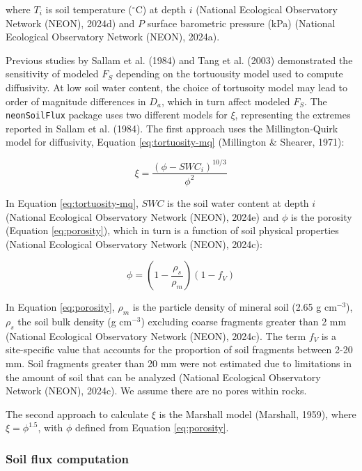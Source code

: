 \documentclass[
  letterpaper,
  DIV=11,
  numbers=noendperiod]{scrartcl}
\begin{document}
where \(T_{i}\) is soil temperature (\(^\circ\)C) at depth \(i\)
(National Ecological Observatory Network (NEON), 2024d) and \(P\)
surface barometric pressure (kPa) (National Ecological Observatory
Network (NEON), 2024a).

Previous studies by Sallam et al. (1984) and Tang et al. (2003)
demonstrated the sensitivity of modeled \(F_{S}\) depending on the
tortuousity model used to compute diffusivity. At low soil water
content, the choice of tortusoity model may lead to order of magnitude
differences in \(D_{a}\), which in turn affect modeled \(F_{S}\). The
\texttt{neonSoilFlux} package uses two different models for \(\xi\),
representing the extremes reported in Sallam et al. (1984). The first
approach uses the Millington-Quirk model for diffusivity, Equation
\ref{eq:tortuosity-mq} (Millington \& Shearer, 1971):

\begin{equation}
  \xi = \frac{(\phi - SWC_{i})^{10/3}}{\phi^{2}}
  \label{eq:tortuosity-mq}
\end{equation}

In Equation \ref{eq:tortuosity-mq}, \(SWC\) is the soil water content at
depth \(i\) (National Ecological Observatory Network (NEON), 2024e) and
\(\phi\) is the porosity (Equation \ref{eq:porosity}), which in turn is
a function of soil physical properties (National Ecological Observatory
Network (NEON), 2024c):

\begin{equation}
  \phi = \left(1- \frac{\rho_{s}}{\rho_{m}} \right) \left(1-f_{V}\right)
  \label{eq:porosity}
\end{equation}

In Equation \ref{eq:porosity}, \(\rho_{m}\) is the particle density of
mineral soil (2.65 g cm\(^{-3}\)), \(\rho_{s}\) the soil bulk density (g
cm\(^{-3}\)) excluding coarse fragments greater than 2 mm (National
Ecological Observatory Network (NEON), 2024c). The term \(f_{V}\) is a
site-specific value that accounts for the proportion of soil fragments
between 2-20 mm. Soil fragments greater than 20 mm were not estimated
due to limitations in the amount of soil that can be analyzed (National
Ecological Observatory Network (NEON), 2024c). We assume there are no
pores within rocks.

The second approach to calculate \(\xi\) is the Marshall model
(Marshall, 1959), where \(\xi = \phi^{1.5}\), with \(\phi\) defined from
Equation \ref{eq:porosity}.

\subsubsection{Soil flux computation}\label{sec-compute-soil-flux}
\end{document}
